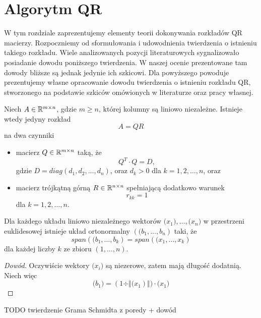 \documentclass[10pt,a4paper]{report}
\newcommand{\vr}[1]{\mathbf{#1}}
\newcommand{\mx}[1]{{#1}}
\begin{document}
\chapter{Algorytm QR}

W tym rozdziale zaprezentujemy elementy teorii dokonywania rozkładów QR macierzy. Rozpoczniemy od sformułowania i udowodnienia twierdzenia o istnieniu takiego rozkładu. Wiele analizowanych pozycji literaturowych sygnalizowało posiadanie dowodu poniższego twierdzenia. W naszej ocenie prezentowane tam dowody bliższe są jednak jedynie ich szkicowi. Dla powyższego powoduje prezentujemy własne opracowanie dowodu twierdzenia o istnieniu rozkładu QR, stworzonego na podstawie szkiców omówionych w literaturze oraz pracy własnej. 

\begin{theorem}[O rozkładzie QR]\label{theorem-qr-docomposition}
Niech $\mx{A} \in \setR^{m \times n}$, gdzie $m\ge n$, której kolumny są liniowo niezależne. Istnieje wtedy jedyny rozkład 
$$
\mx{A} = \mx{Q} \mx{R}
$$ 
na dwa czynniki
\begin{itemize}
\item macierz $\mx{Q} \in \setR^{m \times n} $ taką, że 
$$
Q^{T}\cdot Q=D,
$$
gdzie $D= diag (d_{1}, d_{2}, ..., d_{n})$, oraz $d_{k}>0$ dla $k = 1, 2, \ldots, n$, oraz
\item macierz trójkątną górną $\mx{R} \in \setR^{n \times n}$ spełniającą dodatkowo warunek 
$$
r_{kk}= 1 
$$ 
dla $k = 1, 2, \ldots, n$.
\end{itemize} 
\end{theorem}

\begin{theorem}
Dla każdego układu liniowo niezależnego wektorów $\vr(x_{1}),\ldots,\vr(x_{n})$ w przestrzeni euklidesowej istnieje układ ortonormalny $(\vr(b_{1},\ldots,b_{n})$ taki, że 
$$
span(\vr(b_{1},\ldots,b_{k}) = span(\vr(x_{1},\ldots,x_{k})
$$
dla każdej liczby $k$ ze zbioru $(1,\ldots,n)$.
\end{theorem}

\begin{proof}[Dowód\citep{poreda11}]
Oczywiście wektory $\vr(x_{i})$ są niezerowe, zatem mają długość dodatnią. Niech więc
$$
\vr(b_{1})=(1\div\Vert\vr(x_{1})\Vert)\cdot\vr(x_{1})
$$

\end{proof}
TODO twierdzenie Grama Schmidta z poredy + dowód
\end{document}
